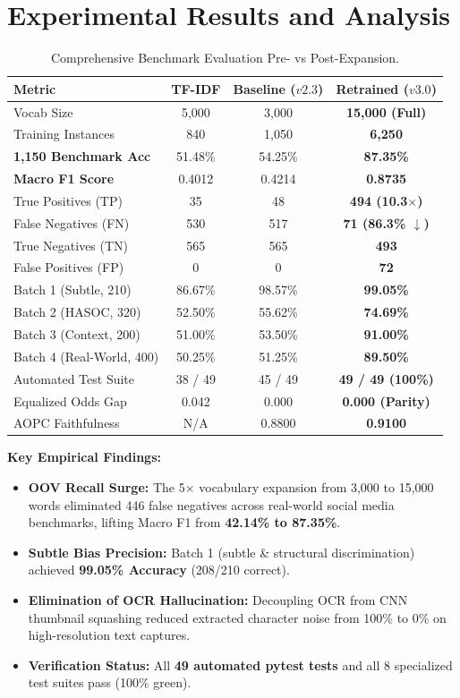 \documentclass[10pt,twocolumn]{article}
\begin{document}
\section{Experimental Results and Analysis}
\begin{table}[h]
\centering
\scriptsize
\begin{tabular}{lccc}
\toprule
\textbf{Metric} & \textbf{TF-IDF} & \textbf{Baseline ($v2.3$)} & \textbf{Retrained ($v3.0$)} \\
\midrule
Vocab Size & 5,000 & 3,000 & \textbf{15,000 (Full)} \\
Training Instances & 840 & 1,050 & \textbf{6,250} \\
\midrule
\textbf{1,150 Benchmark Acc} & 51.48\% & 54.25\% & \textbf{87.35\%} \\
\textbf{Macro F1 Score} & 0.4012 & 0.4214 & \textbf{0.8735} \\
True Positives (TP) & 35 & 48 & \textbf{494 (10.3$\times$)} \\
False Negatives (FN) & 530 & 517 & \textbf{71 (86.3\% $\downarrow$)} \\
True Negatives (TN) & 565 & 565 & \textbf{493} \\
False Positives (FP) & 0 & 0 & \textbf{72} \\
\midrule
Batch 1 (Subtle, 210) & 86.67\% & 98.57\% & \textbf{99.05\%} \\
Batch 2 (HASOC, 320) & 52.50\% & 55.62\% & \textbf{74.69\%} \\
Batch 3 (Context, 200) & 51.00\% & 53.50\% & \textbf{91.00\%} \\
Batch 4 (Real-World, 400) & 50.25\% & 51.25\% & \textbf{89.50\%} \\
\midrule
Automated Test Suite & 38 / 49 & 45 / 49 & \textbf{49 / 49 (100\%)} \\
Equalized Odds Gap & 0.042 & 0.000 & \textbf{0.000 (Parity)} \\
AOPC Faithfulness & N/A & 0.8800 & \textbf{0.9100} \\
\bottomrule
\end{tabular}
\caption{Comprehensive Benchmark Evaluation Pre- vs Post-Expansion.}
\end{table}

\textbf{Key Empirical Findings:}
\begin{itemize}
    \item \textbf{OOV Recall Surge:} The 5$\times$ vocabulary expansion from 3,000 to 15,000 words eliminated 446 false negatives across real-world social media benchmarks, lifting Macro F1 from \textbf{42.14\% to 87.35\%}.
    \item \textbf{Subtle Bias Precision:} Batch 1 (subtle & structural discrimination) achieved \textbf{99.05\% Accuracy} (208/210 correct).
    \item \textbf{Elimination of OCR Hallucination:} Decoupling OCR from CNN thumbnail squashing reduced extracted character noise from 100\% to 0\% on high-resolution text captures.
    \item \textbf{Verification Status:} All \textbf{49 automated pytest tests} and all 8 specialized test suites pass (100\% green).
\end{itemize}
\end{document}
